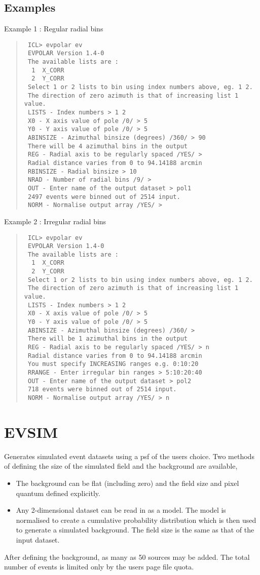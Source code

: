 \documentclass{book}
\renewcommand{\_}{{\tt\char'137}}     %
\begin{document}
\subsection{Examples}
Example 1 : Regular radial bins
\begin{quote}\begin{verbatim}
 ICL> evpolar ev
 EVPOLAR Version 1.4-0
 The available lists are :
  1  X_CORR
  2  Y_CORR
 Select 1 or 2 lists to bin using index numbers above, eg. 1 2.
 The direction of zero azimuth is that of increasing list 1 value.
 LISTS - Index numbers > 1 2
 X0 - X axis value of pole /0/ > 5
 Y0 - Y axis value of pole /0/ > 5
 ABINSIZE - Azimuthal binsize (degrees) /360/ > 90
 There will be 4 azimuthal bins in the output
 REG - Radial axis to be regularly spaced /YES/ >
 Radial distance varies from 0 to 94.14188 arcmin
 RBINSIZE - Radial binsize > 10
 NRAD - Number of radial bins /9/ >
 OUT - Enter name of the output dataset > pol1
 2497 events were binned out of 2514 input.
 NORM - Normalise output array /YES/ >
\end{verbatim}\end{quote}
Example 2 : Irregular radial bins
\begin{quote}\begin{verbatim}
 ICL> evpolar ev
 EVPOLAR Version 1.4-0
 The available lists are :
  1  X_CORR
  2  Y_CORR
 Select 1 or 2 lists to bin using index numbers above, eg. 1 2.
 The direction of zero azimuth is that of increasing list 1 value.
 LISTS - Index numbers > 1 2
 X0 - X axis value of pole /0/ > 5
 Y0 - Y axis value of pole /0/ > 5
 ABINSIZE - Azimuthal binsize (degrees) /360/ >
 There will be 1 azimuthal bins in the output
 REG - Radial axis to be regularly spaced /YES/ > n
 Radial distance varies from 0 to 94.14188 arcmin
 You must specify INCREASING ranges e.g. 0:10:20
 RRANGE - Enter irregular bin ranges > 5:10:20:40
 OUT - Enter name of the output dataset > pol2
 718 events were binned out of 2514 input.
 NORM - Normalise output array /YES/ > n
\end{verbatim}\end{quote}
\section{EVSIM}
Generates simulated event datasets using a psf of the users choice.
Two methods of defining the size of the simulated field and the
background are available,
\begin{itemize}
\item The background can be flat (including zero) and the field size
and pixel quantum defined explicitly.
\item Any 2-dimensional dataset can be read in as a model. The model
is normalised to create a cumulative probability distribution
which is then used to generate a simulated background. The
field size is the same as that of the input dataset.
\end{itemize}
After defining the background, as many as 50 sources may be added.
The total number of events is limited only by the users page file
quota.
 
\end{document}
